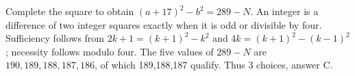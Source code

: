 Complete the square to obtain $(a+17)^2-b^2=289-N$. An integer is a difference of two integer squares exactly when it is odd or divisible by four. Sufficiency follows from $2k+1=(k+1)^2-k^2$ and $4k=(k+1)^2-(k-1)^2$; necessity follows modulo four. The five values of $289-N$ are $190,189,188,187,186$, of which 189,188,187 qualify. Thus $\boxed{3}$ choices, answer C.
